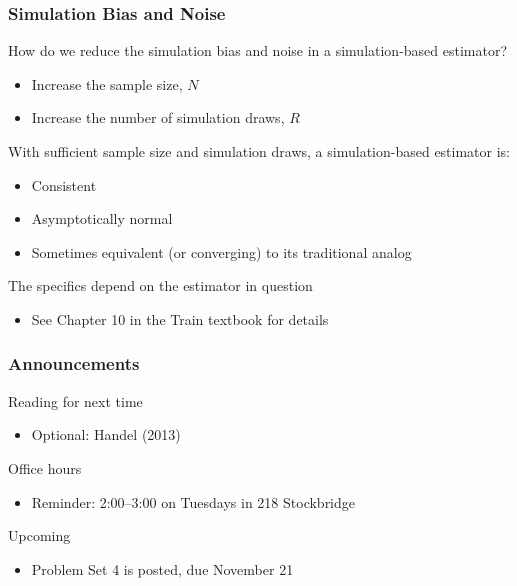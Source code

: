 \documentclass{beamer}
\begin{document}
\begin{frame}\frametitle{Simulation Bias and Noise}
    How do we reduce the simulation bias and noise in a simulation-based estimator?
    \begin{itemize}
        \item Increase the sample size, $N$
        \item Increase the number of simulation draws, $R$
    \end{itemize}
    \vspace{2ex}
    With sufficient sample size and simulation draws, a simulation-based estimator is:
    \begin{itemize}
        \item Consistent
        \item Asymptotically normal
        \item Sometimes equivalent (or converging) to its traditional analog
    \end{itemize}
    \vspace{2ex}
    The specifics depend on the estimator in question
    \begin{itemize}
        \item See Chapter 10 in the Train textbook for details
    \end{itemize}
\end{frame}

\begin{frame}\frametitle{Announcements}
    Reading for next time
    \begin{itemize}
        \item Optional: Handel (2013)
    \end{itemize}
    \vspace{3ex}
    Office hours
    \begin{itemize}
    	\item Reminder: 2:00--3:00 on Tuesdays in 218 Stockbridge
    \end{itemize}
    \vspace{3ex}
    Upcoming
    \begin{itemize}
        \item Problem Set 4 is posted, due November 21
    \end{itemize}
\end{frame}
\end{document}
